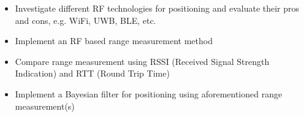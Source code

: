 
\begin{itemize}
    \item Investigate different RF technologies for positioning and evaluate their pros and cons, e.g. WiFi, UWB, BLE, etc.
    \item Implement an RF based range measurement method
    \item Compare range measurement using RSSI (Received Signal Strength Indication) and RTT (Round Trip Time)
    \item Implement a Bayesian filter for positioning using aforementioned range measurement(s)
\end{itemize}